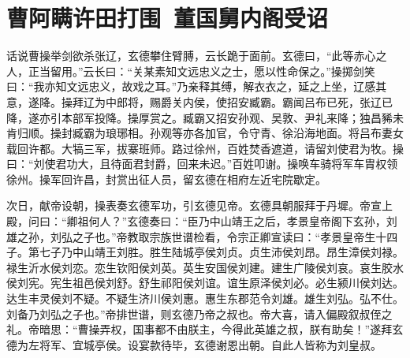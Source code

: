 \chapter{曹阿瞒许田打围~董国舅内阁受诏}

话说曹操举剑欲杀张辽，玄德攀住臂膊，云长跪于面前。玄德曰，“此等赤心之人，正当留用。”云长曰：“关某素知文远忠义之士，愿以性命保之。”操掷剑笑曰：“我亦知文远忠义，故戏之耳。”乃亲释其缚，解衣衣之，延之上坐，辽感其意，遂降。操拜辽为中郎将，赐爵关内侯，使招安臧霸。霸闻吕布已死，张辽已降，遂亦引本部军投降。操厚赏之。臧霸又招安孙观、吴敦、尹礼来降；独昌豨未肯归顺。操封臧霸为琅琊相。孙观等亦各加官，令守青、徐沿海地面。将吕布妻女载回许都。大犒三军，拔寨班师。路过徐州，百姓焚香遮道，请留刘使君为牧。操曰：“刘使君功大，且待面君封爵，回来未迟。”百姓叩谢。操唤车骑将军车胄权领徐州。操军回许昌，封赏出征人员，留玄德在相府左近宅院歇定。

次日，献帝设朝，操表奏玄德军功，引玄德见帝。玄德具朝服拜于丹墀。帝宣上殿，问曰：“卿祖何人？”玄德奏曰：“臣乃中山靖王之后，孝景皇帝阁下玄孙，刘雄之孙，刘弘之子也。”帝教取宗族世谱检看，令宗正卿宣读曰：“孝景皇帝生十四子。第七子乃中山靖王刘胜。胜生陆城亭侯刘贞。贞生沛侯刘昂。昂生漳侯刘禄。禄生沂水侯刘恋。恋生钦阳侯刘英。英生安国侯刘建。建生广陵侯刘哀。哀生胶水侯刘宪。宪生祖邑侯刘舒。舒生祁阳侯刘谊。谊生原泽侯刘必。必生颍川侯刘达。达生丰灵侯刘不疑。不疑生济川侯刘惠。惠生东郡范令刘雄。雄生刘弘。弘不仕。刘备乃刘弘之子也。”帝排世谱，则玄德乃帝之叔也。帝大喜，请入偏殿叙叔侄之礼。帝暗思：“曹操弄权，国事都不由朕主，今得此英雄之叔，朕有助矣！”遂拜玄德为左将军、宜城亭侯。设宴款待毕，玄德谢恩出朝。自此人皆称为刘皇叔。


